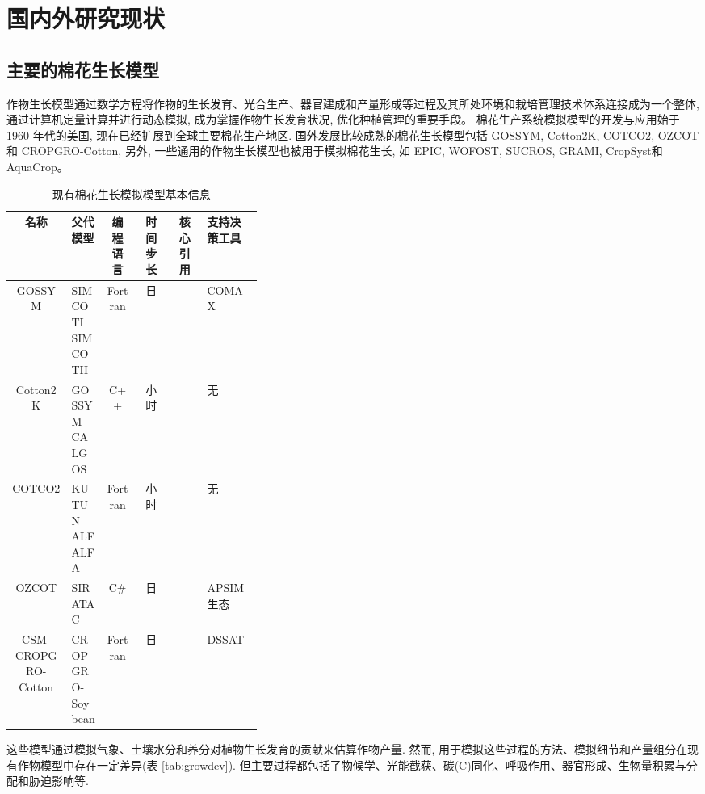 \documentclass[a4paper,zihao=5]{ctexbook}
\begin{document}
\section{国内外研究现状}
\subsection{主要的棉花生长模型}
作物生长模型通过数学方程将作物的生长发育、光合生产、器官建成和产量形成等过程及其所处环境和栽培管理技术体系连接成为一个整体,
通过计算机定量计算并进行动态模拟, 成为掌握作物生长发育状况, 优化种植管理的重要手段。
棉花生产系统模拟模型的开发与应用始于 1960 年代的美国, 现在已经扩展到全球主要棉花生产地区.
国外发展比较成熟的棉花生长模型包括 GOSSYM\cite{baker1976}, Cotton2K\cite{cotton2kv4}, COTCO2\cite{wall1994}, OZCOT\cite{hearn1994} 和 CROPGRO-Cotton\cite{jones2003},
另外, 一些通用的作物生长模型也被用于模拟棉花生长, 如 EPIC\cite{williams1989}, WOFOST\cite{vanDiepen1989WOFOST}, SUCROS\cite{vanittersum2003}, GRAMI\cite{ko2005}, CropSyst\cite{sommer2008}和 AquaCrop\cite{steduto2009}。

\begin{table}
    \caption{现有棉花生长模拟模型基本信息}
    \small
    \centering
    \begin{tabular}{cp{0.14\linewidth}cccp{0.22\linewidth}}
        \toprule
        名称               & 父代模型         & 编程语言 & 时间步长 & 核心引用          & 支持决策工具 \\
        \midrule
        GOSSYM             & SIMCOTI SIMCOTII & Fortran  & 日       &                   & COMAX        \\
        Cotton2K           & GOSSYM CALGOS    & C++      & 小时     &                   & 无           \\
        COTCO2             & KUTUN ALFALFA    & Fortran  & 小时     &                   & 无           \\
        OZCOT              & SIRATAC          & C\#      & 日       & \citet{hearn1994} & APSIM 生态   \\
        CSM-CROPGRO-Cotton & CROPGRO-Soybean  & Fortran  & 日       &                   & DSSAT        \\
        \bottomrule
    \end{tabular}
\end{table}

这些模型通过模拟气象、土壤水分和养分对植物生长发育的贡献来估算作物产量.
然而, 用于模拟这些过程的方法、模拟细节和产量组分在现有作物模型中存在一定差异(表 \ref{tab:growdev})\cite{thorp2014}.
但主要过程都包括了物候学、光能截获、碳(C)同化、呼吸作用、器官形成、生物量积累与分配和胁迫影响等.
\end{document}
